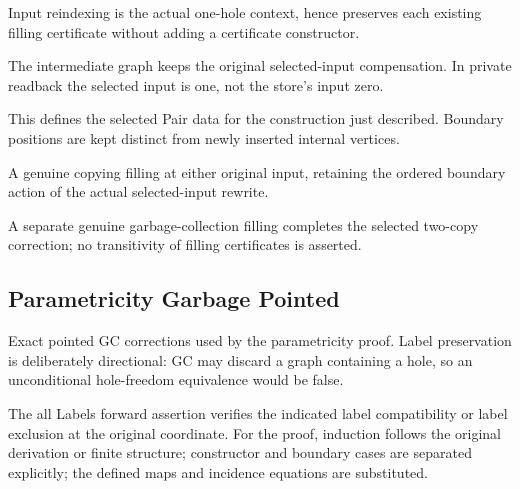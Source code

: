 Input reindexing is the actual one-hole context, hence preserves each existing filling certificate without adding a certificate constructor.
\par{}

The intermediate graph keeps the original selected-input compensation. In private readback the selected input is one, not the store's input zero.
\par{}

This defines the selected Pair data for the construction just described. Boundary positions are kept distinct from newly inserted internal vertices.
\par{}

A genuine copying filling at either original input, retaining the ordered boundary action of the actual selected-input rewrite.
\par{}

A separate genuine garbage-collection filling completes the selected two-copy correction; no transitivity of filling certificates is asserted.
\par{}

\subsection{Parametricity Garbage Pointed}
Exact pointed GC corrections used by the parametricity proof. Label preservation is deliberately directional: GC may discard a graph containing a hole, so an unconditional hole-freedom equivalence would be false.

The all Labels forward assertion verifies the indicated label compatibility or label exclusion at the original coordinate.
For the proof, induction follows the original derivation or finite structure; constructor and boundary cases are separated explicitly; the defined maps and incidence equations are substituted.
\par{}

